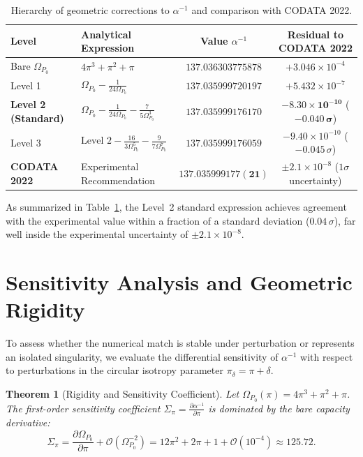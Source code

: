 \documentclass[11pt,a4paper]{article}
\newtheorem{theorem}{Theorem}[section]
\begin{document}
\begin{table}[htbp]
\centering
\caption{Hierarchy of geometric corrections to $\alpha^{-1}$ and comparison with CODATA 2022.}
\label{tab:alpha_hierarchy}
\begin{tabular}{llcc}
\toprule
\textbf{Level} & \textbf{Analytical Expression} & \textbf{Value $\alpha^{-1}$} & \textbf{Residual to CODATA 2022} \\
\midrule
Bare $\Omega_{P_0}$ & $4\pi^3 + \pi^2 + \pi$ & $137.036303775878$ & $+3.046 \times 10^{-4}$ \\
Level 1 & $\Omega_{P_0} - \frac{1}{24\Omega_{P_0}}$ & $137.035999720197$ & $+5.432 \times 10^{-7}$ \\
\textbf{Level 2 (Standard)} & $\Omega_{P_0} - \frac{1}{24\Omega_{P_0}} - \frac{7}{5\Omega_{P_0}^3}$ & $\mathbf{137.035999176170}$ & $\mathbf{-8.30 \times 10^{-10}}$ ($\mathbf{-0.040\,\sigma}$) \\
Level 3 & $\text{Level 2} - \frac{16}{3\Omega_{P_0}^5} - \frac{9}{7\Omega_{P_0}^7}$ & $137.035999176059$ & $-9.40 \times 10^{-10}$ ($-0.045\,\sigma$) \\
\midrule
\textbf{CODATA 2022} & Experimental Recommendation & $\mathbf{137.035999177(21)}$ & $\pm 2.1 \times 10^{-8}$ ($1\sigma$ uncertainty) \\
\bottomrule
\end{tabular}
\end{table}

As summarized in Table~\ref{tab:alpha_hierarchy}, the Level~2 standard expression achieves agreement with the experimental value within a fraction of a standard deviation ($0.04\,\sigma$), far well inside the experimental uncertainty of $\pm 2.1 \times 10^{-8}$.

\section{Sensitivity Analysis and Geometric Rigidity}\label{sec:rigidity}
To assess whether the numerical match is stable under perturbation or represents an isolated singularity, we evaluate the differential sensitivity of $\alpha^{-1}$ with respect to perturbations in the circular isotropy parameter $\pi_\delta = \pi + \delta$.

\begin{theorem}[Rigidity and Sensitivity Coefficient]
Let $\Omega_{P_0}(\pi) = 4\pi^3 + \pi^2 + \pi$. The first-order sensitivity coefficient $\Sigma_\pi = \frac{\partial \alpha^{-1}}{\partial \pi}$ is dominated by the bare capacity derivative:
\begin{equation}
\Sigma_\pi = \frac{\partial \Omega_{P_0}}{\partial \pi} + \mathcal{O}(\Omega_{P_0}^{-2}) = 12\pi^2 + 2\pi + 1 + \mathcal{O}(10^{-4}) \approx 125.72.
\end{equation}
\end{theorem}
\end{document}

